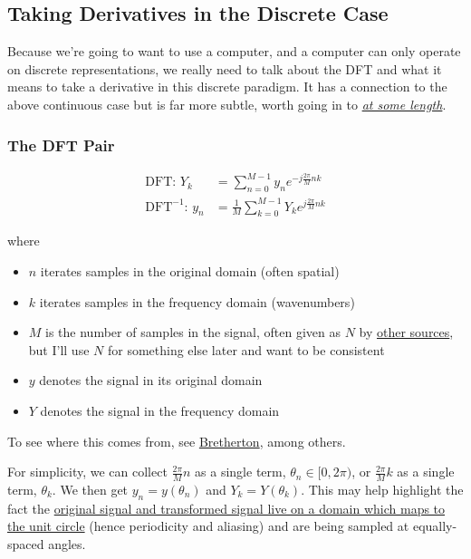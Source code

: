 \documentclass[10pt]{article}
\begin{document}
\subsection{Taking Derivatives in the Discrete Case}

Because we're going to want to use a computer, and a computer can only operate on discrete representations, we really need to talk about the DFT and what it means to take a derivative in this discrete paradigm. It has a connection to the above continuous case but is far more subtle, worth going in to \textit{\href{https://www.youtube.com/watch?v=v7l3Q11DBq0&t=1299s}{at some length}}.

\subsubsection{The DFT Pair}

\begin{equation}\label{dft}
\begin{aligned}
\text{DFT: \ \ } Y_k &= \sum_{n=0}^{M-1} y_n e^{-j \frac{2\pi}{M} n k} \\
\text{DFT} ^{-1} \text{: \ \ } y_n &= \frac{1}{M} \sum_{k=0}^{M-1} Y_k e^{j \frac{2\pi}{M} n k}
\end{aligned}
\end{equation}

where
\begin{itemize}[noitemsep, topsep=0pt, after=\newline]
	\item $n$ iterates samples in the original domain (often spatial)
	\item $k$ iterates samples in the frequency domain (wavenumbers)
	\item $M$ is the number of samples in the signal, often given as $N$ by \href{https://numpy.org/doc/2.1/reference/routines.fft.html}{other sources}\cite{numpy}, but I'll use $N$ for something else later and want to be consistent
	\item $y$ denotes the signal in its original domain
	\item $Y$ denotes the signal in the frequency domain
\end{itemize}

To see where this comes from, see \href{https://atmos.washington.edu/~breth/classes/AM585/lect/DFT_FS_585_notes.pdf}{Bretherton}\cite{bretherton}, among others\cite{oppenheim}.\newline

For simplicity, we can collect $\frac{2\pi}{M}n$ as a single term, $\theta_n \in [0, 2\pi)$, or $\frac{2\pi}{M}k$ as a single term, $\theta_k$. We then get $y_n = y(\theta_n)$ and $Y_k = Y(\theta_k)$. This may help highlight the fact the \href{https://dsp.stackexchange.com/a/18931/40873}{original signal and transformed signal live on a domain which maps to the unit circle}\cite{bristow} (hence periodicity and aliasing) and are being sampled at equally-spaced angles.
\end{document}
